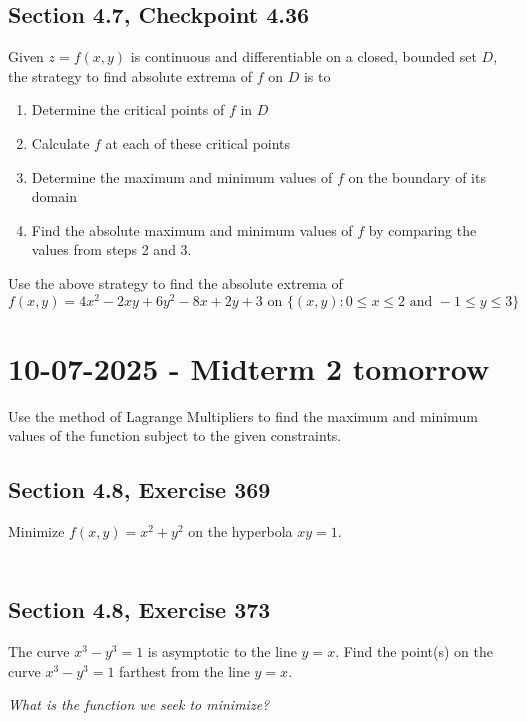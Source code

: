 \documentclass[]{mangos-musings}
\begin{document}
\subsection{Section 4.7, Checkpoint 4.36}
Given $z = f(x, y)$ is continuous and differentiable on a closed, bounded set $D$, the strategy to find absolute extrema of $f$ on $D$ is to 
\begin{enumerate}
  \item Determine the critical points of $f$ in $D$
  \item Calculate $f$ at each of these critical points
  \item Determine the maximum and minimum values of $f$ on the boundary of its domain 
  \item Find the absolute maximum and minimum values of $f$ by comparing the values from steps 2 and 3.
\end{enumerate}
Use the above strategy to find the absolute extrema of
\[f(x, y) = 4x^2 - 2xy + 6y^2 - 8x + 2y + 3 \text{ on }\{(x, y) : 0 \le x \le 2 \text{ and } -1 \le y \le 3\}\]



\newpage
\section{10-07-2025 - Midterm 2 tomorrow}
Use the method of Lagrange Multipliers to find the maximum and minimum values of the function subject to the given constraints.
\subsection{Section 4.8, Exercise 369}
Minimize $f(x, y) = x^2 + y^2$ on the hyperbola $xy = 1$.
\begin{align*}
  \\ \\ \\
\end{align*}
\subsection{Section 4.8, Exercise 373}
The curve $x^3 - y^3 = 1$ is asymptotic to the line  $y = x$. 
Find the point(s) on the curve $x^3 - y^3 = 1$ 
farthest from the line $y = x$.

\textit{What is the function we seek to minimize?}
\begin{align*}
  \\ \\ \\
\end{align*}
\newpage
\end{document}
